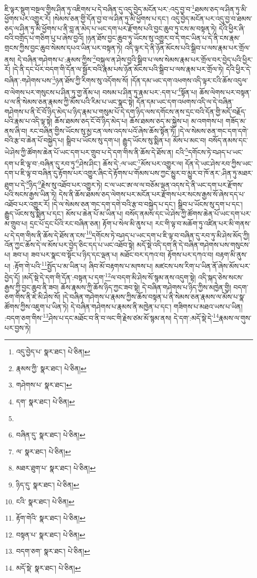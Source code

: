 ཇི་ལྟར་སྡུག་བསྔལ་གྱིས་ཤིན་ཏུ་འཇིགས་པ་དེ་བཞིན་དུ་འདུ་བྱེད་མངོན་པར་:འདུ་བྱ་བ་\footnote{འདུ་བྱེད་པ་  སྣར་ཐང་།  པེ་ཅིན། }ཐམས་ཅད་ལ་ཤིན་ཏུ་མི་ཕྱོགས་པར་འགྱུར་རོ། །སེམས་ཅན་གྱི་དོན་བྱ་བ་ལ་ཤིན་ཏུ་མི་ཕྱོགས་པ་དང་། འདུ་བྱེད་མངོན་པར་འདུ་བྱ་བ་ཐམས་ཅད་ལ་ཤིན་ཏུ་མི་ཕྱོགས་པ་ནི་བླ་ན་མེད་པ་ཡང་དག་པར་རྫོགས་པའི་བྱང་ཆུབ་ཏུ་ངས་མ་བསྟན་ཏེ། དེའི་ཕྱིར་ཞི་བའི་བགྲོད་པ་གཅིག་པུ་པ་ཞེས་བྱའོ། །ཉན་ཐོས་བྱང་ཆུབ་ཏུ་ཡོངས་སུ་འགྱུར་བ་དེ་གང་ཡིན་པ་དེ་ནི་ངས་རྣམ་གྲངས་ཀྱིས་བྱང་ཆུབ་སེམས་དཔའ་ཡིན་པར་བསྟན་ཏེ། འདི་ལྟར་དེ་ནི་ཉོན་མོངས་པའི་སྒྲིབ་པ་ལས་རྣམ་པར་གྲོལ་ནས། དེ་བཞིན་གཤེགས་པ་:རྣམས་ཀྱིས་\footnote{རྣམས་ཀྱི་  སྣར་ཐང་།  པེ་ཅིན། }བསྐུལ་ན་ཤེས་བྱའི་སྒྲིབ་པ་ལས་སེམས་རྣམ་པར་གྲོལ་བར་བྱེད་པའི་ཕྱིར་རོ། །དེ་ནི་དང་པོར་བདག་གི་དོན་ལ་སྦྱོར་བའི་རྣམ་པས་ཉོན་མོངས་པའི་སྒྲིབ་པ་ལས་རྣམ་པར་གྲོལ་ཏེ། དེའི་ཕྱིར་དེ་བཞིན་:གཤེགས་པས་\footnote{གཤེགས་པ་  སྣར་ཐང་། }ཉན་ཐོས་ཀྱི་རིགས་སུ་འདོགས་སོ། །དོན་དམ་ཡང་དག་འཕགས་འདི་ལྟར་ངའི་ཆོས་འདུལ་བ་ལེགས་པར་གསུངས་པ་ཤིན་ཏུ་གྱ་ནོམ་པ། བསམ་པ་ཤིན་ཏུ་རྣམ་པར་:དག་པ་\footnote{དག་  སྣར་ཐང་།  པེ་ཅིན། }སྟོན་པ། ཆོས་ལེགས་པར་བསྟན་པ་ལ་ནི་སེམས་ཅན་རྣམས་ཀྱི་མོས་པའི་རིམ་པ་ཡང་སྣང་སྟེ། དོན་དམ་ཡང་དག་འཕགས་འདི་ལ་དེ་བཞིན་གཤེགས་པ་ནི་ངོ་བོ་ཉིད་མེད་པ་ཉིད་རྣམ་པ་གསུམ་པོ་དེ་དག་ཉིད་ལས་དགོངས་ནས་དྲང་བའི་དོན་གྱི་མདོ་བརྗོད་པའི་རྣམ་པ་འདི་ལྟ་སྟེ། ཆོས་ཐམས་ཅད་ངོ་བོ་ཉིད་མེད་པ། ཆོས་ཐམས་ཅད་མ་སྐྱེས་པ། མ་འགགས་པ། གཟོད་མ་ནས་ཞི་བ། རང་བཞིན་གྱིས་ཡོངས་སུ་མྱ་ངན་ལས་འདས་པའོ་ཞེས་ཆོས་སྟོན་ཏོ། །དེ་ལ་སེམས་ཅན་གང་དག་དགེ་བའི་རྩ་བ་ཆེན་པོ་བསྐྱེད་པ། སྒྲིབ་པ་ཡོངས་སུ་དག་པ། རྒྱུད་ཡོངས་སུ་སྨིན་པ། མོས་པ་མང་བ། བསོད་ནམས་དང་ཡེ་ཤེས་ཀྱི་ཚོགས་ཆེན་པོ་ཡང་དག་པར་གྲུབ་པ་དེ་དག་གིས་ནི་ཆོས་དེ་ཐོས་ན། ངའི་\footnote{}དགོངས་ཏེ་བཤད་པ་ཡང་དག་པ་ཇི་ལྟ་བ་:བཞིན་དུ་རབ་ཏུ་\footnote{བཞིན་དུ་  སྣར་ཐང་།  པེ་ཅིན། }ཤེས་ཤིང་། ཆོས་དེ་:ལ་ཡང་\footnote{ལ་  སྣར་ཐང་།  པེ་ཅིན། }མོས་པར་འགྱུར་ལ། དོན་དེ་ཡང་ཤེས་རབ་ཀྱིས་ཡང་དག་པ་ཇི་ལྟ་བ་བཞིན་དུ་རྟོགས་པར་འགྱུར་ཞིང་དེ་རྟོགས་པ་གོམས་པས་ཀྱང་མྱུར་བ་མྱུར་བ་ཁོ་ནར་:ཤིན་ཏུ་མཐར་ཐུག་པ་དེ་\footnote{མཐར་ཐུག་པ་  སྣར་ཐང་།  པེ་ཅིན། }ཉིད་\footnote{ཉིད་དུ་  སྣར་ཐང་།  པེ་ཅིན། }རྗེས་སུ་འཐོབ་པར་འགྱུར་ཏེ། ང་ལ་ཡང་ཨ་ལ་ལ་བཅོམ་ལྡན་འདས་དེ་ནི་ཡང་དག་པར་རྫོགས་པའི་སངས་རྒྱས་ཡིན་ཏེ། དེས་ནི་ཆོས་ཐམས་ཅད་ལེགས་པར་མངོན་པར་རྫོགས་པར་སངས་རྒྱས་སོ་ཞེས་དད་པ་འཐོབ་པར་འགྱུར་རོ། །དེ་ལ་སེམས་ཅན་གང་དག་དགེ་བའི་རྩ་བ་བསྐྱེད་པ་དང་། སྒྲིབ་པ་ཡོངས་སུ་དག་པ་དང་། རྒྱུད་ཡོངས་སུ་སྨིན་པ་དང་། མོས་པ་ཆེན་པོ་མ་ཡིན་པ། བསོད་ནམས་དང་ཡེ་ཤེས་ཀྱི་ཚོགས་ཆེན་པོ་ཡང་དག་པར་མ་གྲུབ་པ། དྲང་པོ་དྲང་པོའི་རང་བཞིན་ཅན། རྟོག་པ་སེལ་མི་ནུས་པ། རང་གི་ལྟ་བ་མཆོག་ཏུ་འཛིན་པར་མི་གནས་པ་དེ་དག་གིས་ནི་ཆོས་དེ་ཐོས་ན་ངས་\footnote{ངའི་  སྣར་ཐང་།  པེ་ཅིན། }དགོངས་ཏེ་བཤད་པ་ཡང་དག་པ་ཇི་ལྟ་བ་བཞིན་དུ་རབ་ཏུ་མི་ཤེས་མོད་ཀྱི། འོན་ཀྱང་ཆོས་དེ་ལ་མོས་པར་བྱེད་ཅིང་དད་པ་ཡང་འཐོབ་སྟེ། མདོ་སྡེ་འདི་དག་ནི་དེ་བཞིན་གཤེགས་པས་གསུངས་པ། ཟབ་པ། ཟབ་པར་སྣང་བ་སྟོང་པ་ཉིད་དང་ལྡན་པ། མཐོང་བར་དཀའ་བ། རྟོགས་པར་དཀའ་བ། བརྟག་མི་ནུས་པ། :རྟོག་གེ་པའི་\footnote{རྟོག་གེའི་  སྣར་ཐང་།  པེ་ཅིན། }སྤྱོད་པ་མ་ཡིན་པ། ཞིབ་མོ་བརྟགས་པ་མཁས་པ། མཛངས་པས་རིག་པ་ཡིན་ནོ་ཞེས་མོས་པར་བྱེད་དོ། །མདོ་སྡེ་དེ་དག་གི་དོན་:བསྟན་པ་དག་\footnote{བསྟན་པ་  སྣར་ཐང་།  པེ་ཅིན། }ལ་བདག་མི་ཤེས་སོ་སྙམ་ནས་འདུག་སྟེ། འདི་སྐད་ཅེས་སངས་རྒྱས་ཀྱི་བྱང་ཆུབ་ནི་ཟབ། ཆོས་རྣམས་ཀྱི་ཆོས་ཉིད་ཀྱང་ཟབ་སྟེ། དེ་བཞིན་གཤེགས་པ་ཉིད་ཀྱིས་མཁྱེན་གྱི། བདག་ཅག་གིས་ནི་ཇེ་མི་ཤེས་སོ། །དེ་བཞིན་གཤེགས་པ་རྣམས་ཀྱིས་ཆོས་བསྟན་པ་ནི་སེམས་ཅན་རྣམས་ལ་མོས་པ་སྣ་ཚོགས་ཀྱིས་འཇུག་པ་ཡིན་ཏེ། དེ་བཞིན་གཤེགས་པ་རྣམས་ནི་མཁྱེན་པ་དང་། གཟིགས་པ་མཐའ་ཡས་པ་ཡིན། :བདག་ཅག་གིས་\footnote{བདག་ཅག་  སྣར་ཐང་།  པེ་ཅིན། }ཤེས་པ་དང་མཐོང་བ་ནི་བ་ལང་གི་རྗེས་ཙམ་མོ་སྙམ་ནས། དེ་དག་:མདོ་སྡེ་དེ་\footnote{མདོ་སྡེ་  སྣར་ཐང་།  པེ་ཅིན། }རྣམས་ལ་གུས་པར་བྱས་ཏེ། 